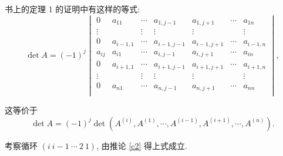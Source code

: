 \documentclass[color=black,device=normal,lang=cn,mode=geye]{elegantnote}
\begin{document}
书上的定理 1 的证明中有这样的等式:
\[\det A=(-1)^j\begin{vmatrix}
    0 & a_{11} & \cdots & a_{1,j-1} & a_{1,j+1} & \cdots & a_{1n} \\
    \vdots && \vdots & \vdots & \vdots && \vdots \\
    0 & a_{i-1,1} & \cdots & a_{i-1,j-1} & a_{i-1,j+1} & \cdots & a_{i-1,n} \\
    a_{ij} & a_{i1} & \cdots & a_{i,j-1} & a_{i,j+1} & \cdots & a_{in} \\
    0 & a_{i+1,1} & \cdots & a_{i+1,j-1} & a_{i+1,j+1} & \cdots & a_{i+1,n} \\
    \vdots && \vdots & \vdots & \vdots && \vdots \\
    0 & a_{n1} & \cdots & a_{n,j-1} & a_{n,j+1} & \cdots & a_{nn} \\
\end{vmatrix},\]

这等价于
\[\det A=(-1)^j\det(A^{(i)},A^{(1)},\cdots,A^{(i-1)},A^{(i+1)},\cdots,A^{(n)}).\]

考察循环 $(i\ i-1\ \cdots\ 2\ 1)$, 由推论 \ref{c2} 得上式成立.
\end{document}
